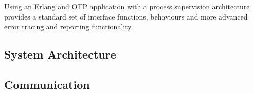 Using an Erlang and OTP application with a process supervision architecture provides a standard set of interface functions, behaviours and more advanced error tracing and reporting functionality.

\subsection{System Architecture}
\label{sys_overview_architecture}

\subsection{Communication}

\clearpage
\endinput
